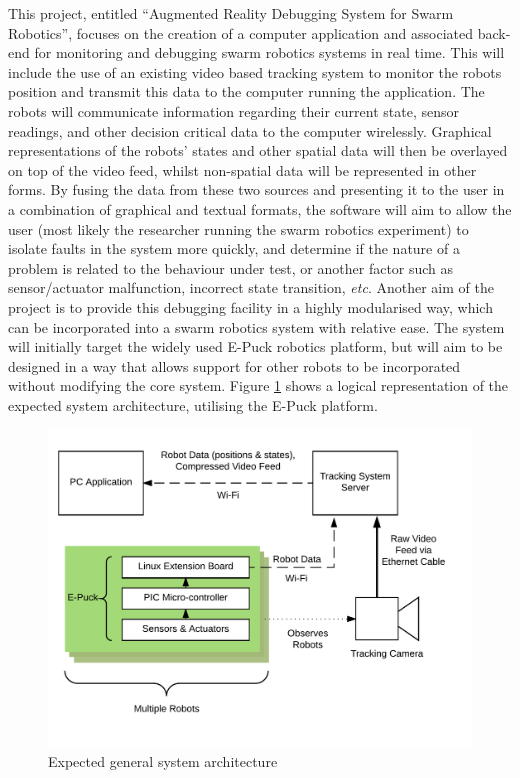 \documentclass[titlepage,hidelinks,10pt]{article}
\begin{document}
This project, entitled ``Augmented Reality Debugging System for Swarm Robotics'', focuses on the creation of a computer application and associated back-end for monitoring and debugging swarm robotics systems in real time. This will include the use of an existing video based tracking system to monitor the robots position and transmit this data to the computer running the application. The robots will communicate information regarding their current state, sensor readings, and other decision critical data to the computer wirelessly. Graphical representations of the robots' states and other spatial data will then be overlayed on top of the video feed, whilst non-spatial data will be represented in other forms. By fusing the data from these two sources and presenting it to the user in a combination of graphical and textual formats, the software will aim to allow the user (most likely the researcher running the swarm robotics experiment) to isolate faults in the system more quickly, and determine if the nature of a problem is related to the behaviour under test, or another factor such as sensor/actuator malfunction, incorrect state transition, \textit{etc}. Another aim of the project is to provide this debugging facility in a highly modularised way, which can be incorporated into a swarm robotics system with relative ease. The system will initially target the widely used E-Puck\cite{epuck} robotics platform, but will aim to be designed in a way that allows support for other robots to be incorporated without modifying the core system. Figure \ref{fig:SystemArchitecture} shows a logical representation of the expected system architecture, utilising the E-Puck platform. 

\begin{figure}[H]
	\begin{center}
	\includegraphics[scale=0.9]{SystemArchitecture.png}
	\caption{Expected general system architecture}
	\label{fig:SystemArchitecture}
	\end{center}
\end{figure}
\end{document}
